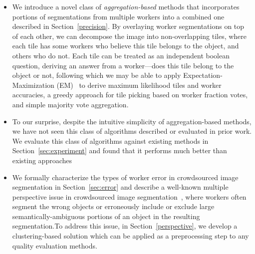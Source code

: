 \begin{itemize}
	\item We introduce a novel class of {\em aggregation-based} methods that incorporates portions of segmentations from multiple workers into a combined one described in Section~\ref{precision}. By overlaying worker segmentations on top of each other, we can decompose the image into non-overlapping tiles, where each tile has some workers who believe this tile belongs to the object, and others who do not. Each tile can be treated as an independent boolean question, deriving an answer from a worker---does this tile belong to the object or not, following which we may be able to apply Expectation-Maximization (EM)~\cite{Dawid1979} to derive maximum likelihood tiles and worker accuracies, a greedy approach for tile picking based on worker fraction votes, and simple majority vote aggregation. 
	\item To our surprise, despite the intuitive simplicity of aggregation-based methods, we have not seen this class of algorithms described or evaluated in prior work. We evaluate this class of algorithms against existing methods in Section~\ref{sec:experiment} and found that it performs much better than existing approaches
	\item We formally characterize the types of worker error in crowdsourced image segmentation in Section~\ref{sec:error} and describe a well-known multiple perspective issue in crowdsourced image segmentation~\cite{Sorokin2008,Lin2014,Gurari2018}, where workers often segment the wrong objects or erroneously include or exclude large semantically-ambiguous portions of an object in the resulting segmentation.To address this issue, in Section~\ref{perspective}, we develop a clustering-based solution which can be applied as a preprocessing step to any quality evaluation methods.
\end{itemize}

